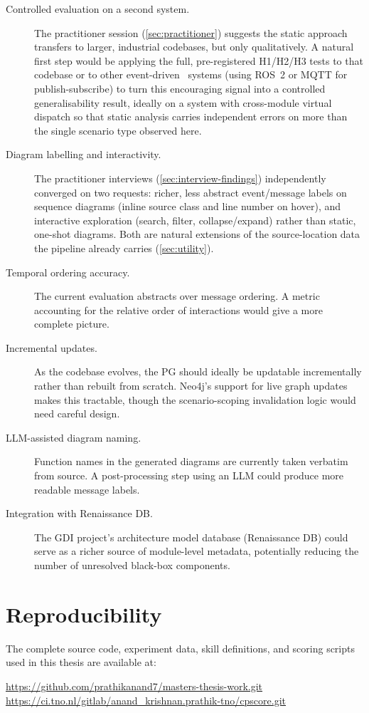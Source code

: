 \begin{description}
  \item[Controlled evaluation on a second system.]
    The practitioner session (\cref{sec:practitioner}) suggests the
    static approach transfers to larger, industrial codebases, but only
    qualitatively. A natural first step would be applying the full,
    pre-registered H1/H2/H3 tests to that codebase or to other
    event-driven \Cpp\ systems (\eg using ROS~2 or MQTT for
    publish-subscribe) to turn this encouraging signal into a controlled
    generalisability result, ideally on a system with cross-module
    virtual dispatch so that static analysis carries independent errors
    on more than the single scenario type observed here.
 
  \item[Diagram labelling and interactivity.]
    The practitioner interviews (\cref{sec:interview-findings})
    independently converged on two requests: richer, less abstract
    event/message labels on sequence diagrams (\eg inline source class
    and line number on hover), and interactive exploration (search,
    filter, collapse/expand) rather than static, one-shot diagrams. Both
    are natural extensions of the source-location data the pipeline
    already carries (\cref{sec:utility}).

  \item[Temporal ordering accuracy.]
    The current evaluation abstracts over message ordering. A metric
    accounting for the relative order of interactions would give a more
    complete picture.

  \item[Incremental updates.]
    As the codebase evolves, the \ac{PG} should ideally be updatable
    incrementally rather than rebuilt from scratch. Neo4j's support for
    live graph updates makes this tractable, though the
    scenario-scoping invalidation logic would need careful design.

  \item[LLM-assisted diagram naming.]
    Function names in the generated diagrams are currently taken
    verbatim from source. A post-processing step using an \ac{LLM} could
    produce more readable message labels.

  \item[Integration with Renaissance DB.]
    The \ac{GDI} project's architecture model database (Renaissance DB)
    could serve as a richer source of module-level metadata, potentially
    reducing the number of unresolved black-box components.
\end{description}

\section{Reproducibility}

The complete source code, experiment data, skill definitions, and scoring
scripts used in this thesis are available at:

\begin{center}
\url{https://github.com/prathikanand7/masters-thesis-work.git}
\url{https://ci.tno.nl/gitlab/anand_krishnan.prathik-tno/cpscore.git}
\end{center}
